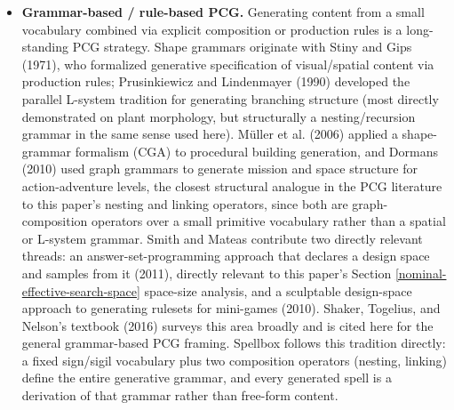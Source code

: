 \documentclass[]{article}
\begin{document}
        \begin{itemize}
            \item
                \textbf{Grammar-based / rule-based PCG.} Generating content from a small vocabulary combined via explicit composition or production rules is a long-standing PCG strategy. Shape grammars originate with Stiny and Gips (1971), who formalized generative specification of visual/spatial content via production rules; Prusinkiewicz and Lindenmayer (1990) developed the parallel L-system tradition for generating branching structure (most directly demonstrated on plant morphology, but structurally a nesting/recursion grammar in the same sense used here). Müller et al. (2006) applied a shape-grammar formalism (CGA) to procedural building generation, and Dormans (2010) used graph grammars to generate mission and space structure for action-adventure levels, the closest structural analogue in the PCG literature to this paper's nesting and linking operators, since both are graph-composition operators over a small primitive vocabulary rather than a spatial or L-system grammar. Smith and Mateas contribute two directly relevant threads: an answer-set-programming approach that declares a design space and samples from it (2011), directly relevant to this paper's Section \ref{nominal-effective-search-space} space-size analysis, and a sculptable design-space approach to generating rulesets for mini-games (2010). Shaker, Togelius, and Nelson's textbook (2016) surveys this area broadly and is cited here for the general grammar-based PCG framing. Spellbox follows this tradition directly: a fixed sign/sigil vocabulary plus two composition operators (nesting, linking) define the entire generative grammar, and every generated spell is a derivation of that grammar rather than free-form content.


\end{itemize}
\end{document}
